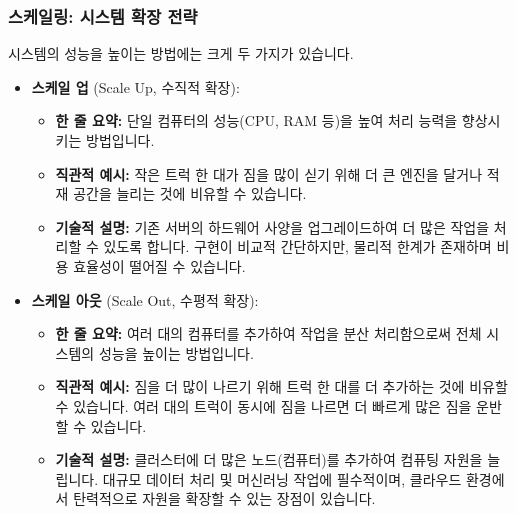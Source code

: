 \documentclass[11pt,a4paper]{article}
\theoremstyle{definition}
\begin{document}
\subsubsection*{스케일링: 시스템 확장 전략}
시스템의 성능을 높이는 방법에는 크게 두 가지가 있습니다.
\begin{itemize}
    \item \textbf{스케일 업} (Scale Up, 수직적 확장):
    \begin{itemize}
        \item \textbf{한 줄 요약:} 단일 컴퓨터의 성능(CPU, RAM 등)을 높여 처리 능력을 향상시키는 방법입니다.
        \item \textbf{직관적 예시:} 작은 트럭 한 대가 짐을 많이 싣기 위해 더 큰 엔진을 달거나 적재 공간을 늘리는 것에 비유할 수 있습니다.
        \item \textbf{기술적 설명:} 기존 서버의 하드웨어 사양을 업그레이드하여 더 많은 작업을 처리할 수 있도록 합니다. 구현이 비교적 간단하지만, 물리적 한계가 존재하며 비용 효율성이 떨어질 수 있습니다.
    \end{itemize}
    \item \textbf{스케일 아웃} (Scale Out, 수평적 확장):
    \begin{itemize}
        \item \textbf{한 줄 요약:} 여러 대의 컴퓨터를 추가하여 작업을 분산 처리함으로써 전체 시스템의 성능을 높이는 방법입니다.
        \item \textbf{직관적 예시:} 짐을 더 많이 나르기 위해 트럭 한 대를 더 추가하는 것에 비유할 수 있습니다. 여러 대의 트럭이 동시에 짐을 나르면 더 빠르게 많은 짐을 운반할 수 있습니다.
        \item \textbf{기술적 설명:} 클러스터에 더 많은 노드(컴퓨터)를 추가하여 컴퓨팅 자원을 늘립니다. 대규모 데이터 처리 및 머신러닝 작업에 필수적이며, 클라우드 환경에서 탄력적으로 자원을 확장할 수 있는 장점이 있습니다.
    \end{itemize}
\end{itemize}
\end{document}
